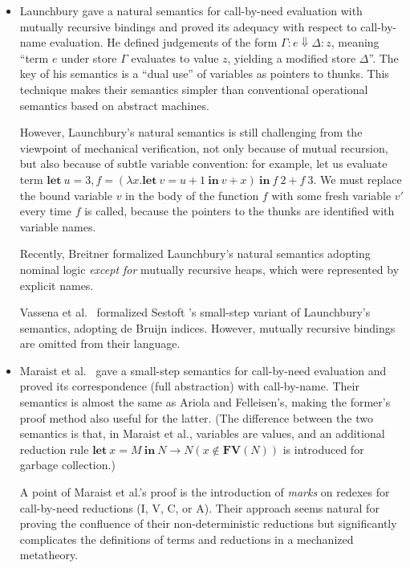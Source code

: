 \documentclass[english]{sumiilab-paper}
\newcommand{\LET}[3]{\mathbf{let}~#1=#2~\mathbf{in}~#3}
\begin{document}
\begin{itemize}
\item
Launchbury \cite{Launchbury93} gave a natural semantics for call-by-need evaluation with mutually recursive bindings and proved its adequacy with respect to call-by-name evaluation.
He defined judgements of the form $\Gamma : e \Downarrow \Delta : z$, meaning ``term $e$ under store $\Gamma$ evaluates to value $z$, yielding a modified store $\Delta$''.
%
The key of his semantics is a ``dual use'' of variables as pointers to thunks.
This technique makes their semantics simpler than conventional operational semantics based on abstract machines.

However, Launchbury's natural semantics is still challenging from the viewpoint of mechanical verification, not only because of mutual recursion, but also because of subtle variable convention:
for example, let us evaluate term $\mathbf{let}~u=3, f = (\lambda x.\LET{v}{u+1}{v+x})~\mathbf{in}~f~2+f~3$.
%
We must replace the bound variable $v$ in the body of the function $f$ with some fresh variable $v'$ every time $f$ is called,
because the pointers to the thunks are identified with variable names.

Recently, Breitner \cite{breitner_2018} formalized Launchbury's natural semantics adopting nominal logic \cite{NominalLogic}
\emph{except for} mutually recursive heaps, which were represented by explicit names.

Vassena et al.~\cite{VassenaBR17} formalized Sestoft \cite{Sestoft97}'s small-step variant of Launchbury's semantics, adopting de Bruijn indices.
However, mutually recursive bindings are omitted from their language.

\item
Maraist et al.~\cite{Maraist98} gave a small-step semantics for call-by-need evaluation and proved its correspondence (full abstraction) with call-by-name.
Their semantics is almost the same as Ariola and Felleisen's,
making the former's proof method also useful for the latter.
(The difference between the two semantics is that, in Maraist et al., variables are values, and an additional reduction rule
$\LET{x}{M}{N} \rightarrow N (x \notin \mathbf{FV}(N))$
is introduced for garbage collection.)

A point of Maraist et al.'s proof is the introduction of \emph{marks} on redexes for call-by-need reductions (I, V, C, or A).
Their approach seems natural for proving the confluence of their non-deterministic reductions but significantly complicates the definitions of terms and reductions in a mechanized metatheory.


\end{itemize}
\end{document}
